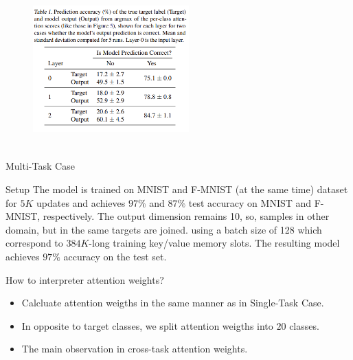 \documentclass{beamer}
\begin{document}
\begin{frame}
\begin{figure}[h]
    \centering
    \includegraphics[width=6cm, height=6cm]{single_task_results.png}
\end{figure}
\end{frame}

\begin{frame}{Multi-Task Case}
    \begin{block}{Setup}
        The model is trained on MNIST and F-MNIST (at the same time) dataset for $5K$ updates and achieves $97\%$ and $87\%$ test accuracy on MNIST and F-MNIST, respectively. The output dimension remains 10, so, samples in other domain, but in the same targets are joined. using a batch size of 128 which correspond to $384 K$-long training key/value memory slots. The resulting model achieves $97\%$ accuracy on the test set.
    \end{block}
    \begin{block}{How to interpreter attention weights?}
        \begin{itemize}
            \item Calcluate attention weigths in the same manner as in Single-Task Case.
            \item In opposite to target classes, we split attention weigths into $20$ classes.
            \item The main observation in cross-task attention weights.
        \end{itemize}
    \end{block}
\end{frame}
\end{document}
